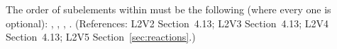 The order of subelements within \Reaction must be the following
(where every one is optional): ,
, ,
.  (References: L2V2 Section~4.13; L2V3
Section~4.13; L2V4 Section~4.13; L2V5 Section~\ref{sec:reactions}.)
